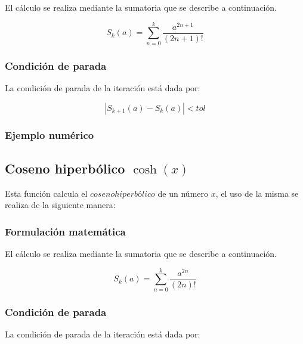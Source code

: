\documentclass[10pt,a4paper]{article}
\begin{document}
	El cálculo se realiza mediante la sumatoria que se describe a continuación.
	
	\begin{equation}\label{key14}
		S_{k}(a) = \sum_{n=0}^{k}\frac{a^{2n + 1}}{(2n + 1)!}
	\end{equation}
	
	\subsubsection{Condición de parada}
	
	La condición de parada de la iteración está dada por: 
	
	\begin{equation}\label{key15}
		\left\lvert S_{k+1}(a) - S_{k}(a) \right\lvert < tol
	\end{equation}
		
	\subsubsection{Ejemplo numérico}
	
	\subsection{Coseno hiperbólico $\cosh(x)$}
	
	Esta función calcula el $coseno hiperbólico$ de un número $x$, el uso de la misma se realiza de la siguiente manera:
	
	\begin{center}
	\end{center}
	
	\subsubsection{Formulación matemática}

	El cálculo se realiza mediante la sumatoria que se describe a continuación.

	\begin{equation}\label{key16}
		S_{k}(a) = \sum_{n=0}^{k}\frac{a^{2n}}{(2n)!}
	\end{equation}

	\subsubsection{Condición de parada}

	La condición de parada de la iteración está dada por: 
\end{document}
